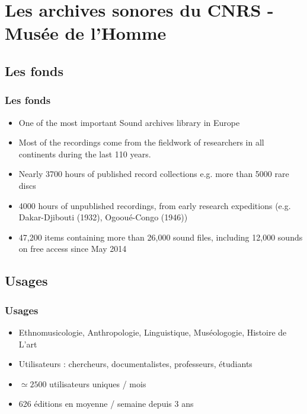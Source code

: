 \documentclass[final, hyperref, table]{beamer}
\begin{document}
\section[CREM archives]{Les archives sonores du CNRS - Musée de l'Homme}\label{sec:archives-CREM}
    
    \subsection{Les fonds}
   \begin{frame}\frametitle{Les fonds}
     \begin{block}{}
       \begin{itemize}
       \item One of the most important Sound archives library in Europe
       \item Most of the recordings come from the fieldwork of
      researchers in \alert{all continents} during the last \alert{110 years}.

    \item Nearly \alert{3700 hours of published record collections} e.g. more than 5000 rare discs
    \item \alert{4000 hours of unpublished recordings}, from early
      research expeditions (e.g. Dakar-Djibouti (1932), Ogooué-Congo
      (1946))
    \item \alert{47,200 items} containing more than
      \alert{26,000 sound files}, including 12,000 sounds on free
      access since May 2014
          
       \end{itemize}
     \end{block}
    \end{frame}
    
    \subsection{Usages}
     \begin{frame}\frametitle{Usages}
      \begin{block}{}
       \begin{itemize}
    \item Ethnomusicologie, Anthropologie, Linguistique, Muséologogie, Histoire de L'art
    \item Utilisateurs : chercheurs, documentalistes, professeurs, étudiants
    \item $\simeq2500$ utilisateurs uniques / mois
    \item 626 éditions en moyenne / semaine depuis 3 ans
       \end{itemize}
     \end{block}
     \end{frame}
     
\end{document}
